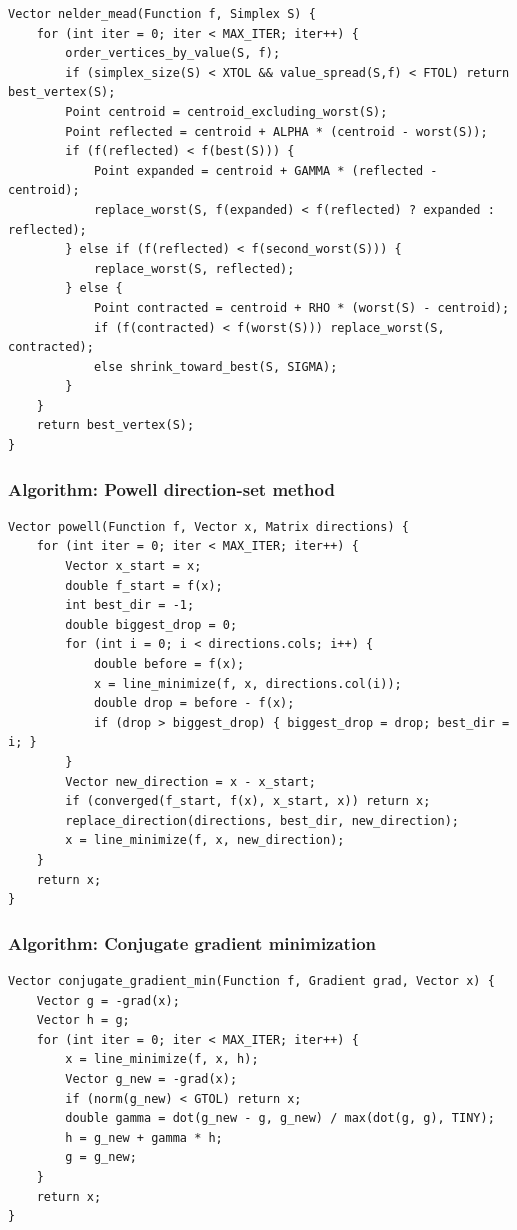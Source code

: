 \documentclass[11pt]{article}
\begin{document}
\begin{verbatim}
Vector nelder_mead(Function f, Simplex S) {
    for (int iter = 0; iter < MAX_ITER; iter++) {
        order_vertices_by_value(S, f);
        if (simplex_size(S) < XTOL && value_spread(S,f) < FTOL) return best_vertex(S);
        Point centroid = centroid_excluding_worst(S);
        Point reflected = centroid + ALPHA * (centroid - worst(S));
        if (f(reflected) < f(best(S))) {
            Point expanded = centroid + GAMMA * (reflected - centroid);
            replace_worst(S, f(expanded) < f(reflected) ? expanded : reflected);
        } else if (f(reflected) < f(second_worst(S))) {
            replace_worst(S, reflected);
        } else {
            Point contracted = centroid + RHO * (worst(S) - centroid);
            if (f(contracted) < f(worst(S))) replace_worst(S, contracted);
            else shrink_toward_best(S, SIGMA);
        }
    }
    return best_vertex(S);
}
\end{verbatim}

\subsubsection{Algorithm: Powell direction-set method}\label{algorithm-powell-direction-set-method}

\begin{verbatim}
Vector powell(Function f, Vector x, Matrix directions) {
    for (int iter = 0; iter < MAX_ITER; iter++) {
        Vector x_start = x;
        double f_start = f(x);
        int best_dir = -1;
        double biggest_drop = 0;
        for (int i = 0; i < directions.cols; i++) {
            double before = f(x);
            x = line_minimize(f, x, directions.col(i));
            double drop = before - f(x);
            if (drop > biggest_drop) { biggest_drop = drop; best_dir = i; }
        }
        Vector new_direction = x - x_start;
        if (converged(f_start, f(x), x_start, x)) return x;
        replace_direction(directions, best_dir, new_direction);
        x = line_minimize(f, x, new_direction);
    }
    return x;
}
\end{verbatim}

\subsubsection{Algorithm: Conjugate gradient minimization}\label{algorithm-conjugate-gradient-minimization}

\begin{verbatim}
Vector conjugate_gradient_min(Function f, Gradient grad, Vector x) {
    Vector g = -grad(x);
    Vector h = g;
    for (int iter = 0; iter < MAX_ITER; iter++) {
        x = line_minimize(f, x, h);
        Vector g_new = -grad(x);
        if (norm(g_new) < GTOL) return x;
        double gamma = dot(g_new - g, g_new) / max(dot(g, g), TINY);
        h = g_new + gamma * h;
        g = g_new;
    }
    return x;
}
\end{verbatim}
\end{document}
